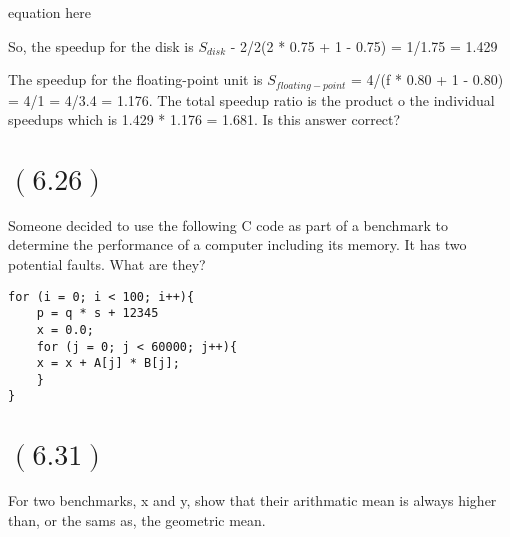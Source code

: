 \documentclass[letterpaper,12pt,titlepage]{article}
\begin{document}
equation here

So, the speedup for the disk is $S_{disk}$ - 2/2(2 * 0.75 + 1 - 0.75) = 1/1.75 = 1.429

The speedup for the floating-point unit is $S_{floating-point}$ = 4/(f * 0.80 + 1 - 0.80) = 4/1 = 4/3.4 = 1.176. The total speedup ratio is the product o the individual speedups which is 1.429 * 1.176 = 1.681. Is this answer correct?

\begin{mdframed}[style=MyFrame]
\end{mdframed}

\section*{$(6.26)$} Someone decided to use the following C code as part of a benchmark to determine the performance of a computer including its memory. It has two potential faults. What are they?

\begin{verbatim}
for (i = 0; i < 100; i++){
    p = q * s + 12345
    x = 0.0;
    for (j = 0; j < 60000; j++){
    x = x + A[j] * B[j];
    }
}
\end{verbatim}

\begin{mdframed}[style=MyFrame]
\end{mdframed}

\section*{$(6.31)$} For two benchmarks, x and y, show that their arithmatic mean is always higher than, or the sams as, the geometric mean.

\begin{mdframed}[style=MyFrame]
\end{mdframed}



\end{document}
